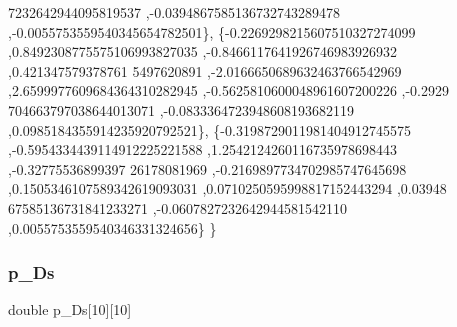\begin{DoxyCode}
      7232642944095819537 ,-0.0394867585136732743289478 ,-0.0055753559540345654782501\},
\{-0.2269298215607510327274099 ,0.8492308775575106993827035 ,-0.8466117641926746983926932 ,0.421347579378761
      5497620891 ,-2.0166650689632463766542969 ,2.6599977609684364310282945 ,-0.5625810600048961607200226 ,-0.2929
      704663797038644013071 ,-0.0833364723948608193682119 ,0.0985184355914235920792521\},
\{-0.3198729011981404912745575 ,-0.5954334439114912225221588 ,1.2542124260116735978698443 ,-0.32775536899397
      26178081969 ,-0.2169897734702985747645698 ,0.1505346107589342619093031 ,0.0710250595998817152443294 ,0.03948
      67585136731841233271 ,-0.0607827232642944581542110 ,0.0055753559540346331324656\}
\}
\end{DoxyCode}
\mbox{\label{a00452_ada19a548901d8b04fd5c62d0e30d53f7}} 
\subsubsection{\texorpdfstring{p\+\_\+\+Ds}{p\_Ds}}
{\footnotesize\ttfamily double p\+\_\+\+Ds\mbox{[}10\mbox{]}\mbox{[}10\mbox{]}}

